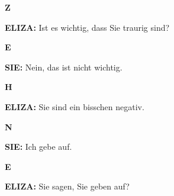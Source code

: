 \documentclass{article}
\begin{document}
\vspace{0.5cm}

\begin{minipage}[t]{0.13\textwidth}
  \centering
  {\bfseries\fontsize{14.4}{14.4}\selectfont\textcolor{pastelblue}{Z}}
\end{minipage}%
\begin{minipage}[t]{0.81\textwidth}
  \textbf{ELIZA:} Ist es wichtig, dass Sie traurig sind?
\end{minipage}

\vspace{0.5cm}

\begin{minipage}[t]{0.13\textwidth}
  \centering
  {\bfseries\fontsize{14.4}{14.4}\selectfont\textcolor{pastelblue}{E}}
\end{minipage}%
\begin{minipage}[t]{0.81\textwidth}
  \textbf{SIE:} Nein, das ist nicht wichtig.
\end{minipage}

\vspace{0.5cm}

\begin{minipage}[t]{0.13\textwidth}
  \centering
  {\bfseries\fontsize{14.4}{14.4}\selectfont\textcolor{pastelblue}{H}}
\end{minipage}%
\begin{minipage}[t]{0.81\textwidth}
  \textbf{ELIZA:} Sie sind ein bisschen negativ.
\end{minipage}

\vspace{0.5cm}

\begin{minipage}[t]{0.13\textwidth}
  \centering
  {\bfseries\fontsize{14.4}{14.4}\selectfont\textcolor{pastelblue}{N}}
\end{minipage}%
\begin{minipage}[t]{0.81\textwidth}
  \textbf{SIE:} Ich gebe auf.
\end{minipage}

\vspace{0.5cm}

\begin{minipage}[t]{0.13\textwidth}
  \centering
  {\bfseries\fontsize{14.4}{14.4}\selectfont\textcolor{pastelblue}{E}}
\end{minipage}%
\begin{minipage}[t]{0.81\textwidth}
  \textbf{ELIZA:} Sie sagen, Sie geben auf?
\end{minipage}
\end{document}
